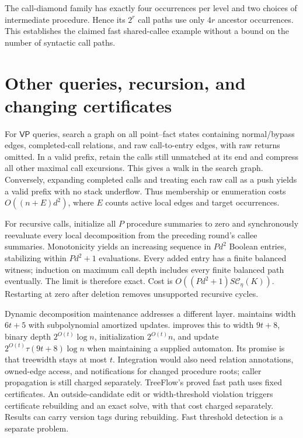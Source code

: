 \documentclass[11pt,letterpaper]{article}
\theoremstyle{definition}
\newcommand{\VP}{\mathsf{VP}}
\newcommand{\cost}{\mathcal C_\eta}
\begin{document}
The call-diamond family has exactly four occurrences per level and two
choices of intermediate procedure. Hence its $2^r$ call paths use only
$4r$ ancestor occurrences. This establishes the claimed fast shared-callee
example without a bound on the number of syntactic call paths.

\section{Other queries, recursion, and changing certificates}\label{sec:beyond}
For $\VP$ queries, search a graph on all point--fact states containing
normal/bypass edges, completed-call relations, and raw call-to-entry
edges, with raw returns omitted. In a valid prefix, retain the calls
still unmatched at its end and compress all other maximal call excursions.
This gives a walk in the search graph. Conversely, expanding completed
calls and treating each raw call as a push yields a valid prefix with no
stack underflow. Thus membership or enumeration costs $O((n+E)d^2)$,
where $E$ counts active local edges and target occurrences.

For recursive calls, initialize all $P$ procedure summaries to zero and
synchronously reevaluate every local decomposition from the preceding
round's callee summaries. Monotonicity yields an increasing sequence in
$Pd^2$ Boolean entries, stabilizing within $Pd^2+1$ evaluations.
Every added entry has a finite balanced witness; induction on maximum
call depth includes every finite balanced path eventually. The limit is
therefore exact. Cost is $O((Pd^2+1)S\cost(K))$. Restarting at zero
after deletion removes unsupported recursive cycles.

Dynamic decomposition maintenance addresses a different layer.
\cite{KMNPS23} maintains width $6t+5$ with subpolynomial amortized updates.
\cite[Theorem~1.1]{Korhonen25} improves this to width $9t+8$, binary
depth $2^{O(t)}\log n$, initialization $2^{O(t)}n$, and update
$2^{O(t)}\tau(9t+8)\log n$ when maintaining a supplied automaton.
Its promise is that treewidth stays at most $t$. Integration would also
need relation annotations, owned-edge access, and notifications for changed
procedure roots; caller propagation is still charged separately. TreeFlow's
proved fast path uses fixed certificates. An outside-candidate edit or
width-threshold violation triggers certificate rebuilding and an exact
solve, with that cost charged separately. Results can carry version tags
during rebuilding. Fast threshold detection is a separate problem.
\end{document}
